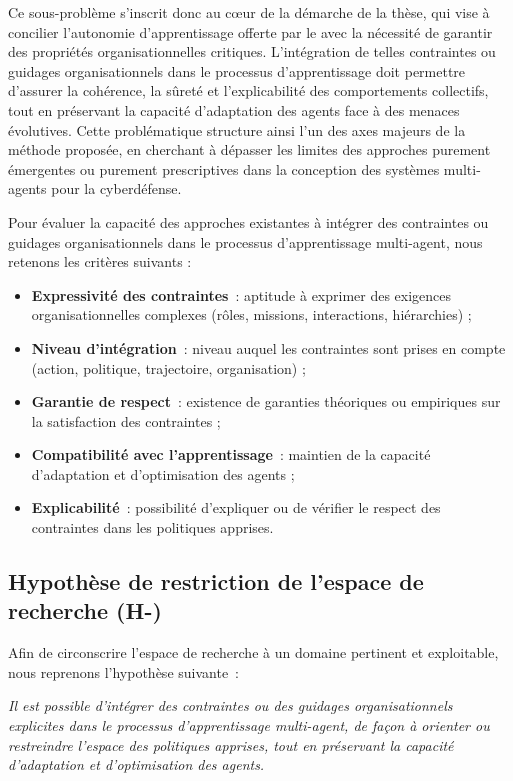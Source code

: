 Ce sous-problème s'inscrit donc au cœur de la démarche de la thèse, qui vise à concilier l'autonomie d'apprentissage offerte par le  avec la nécessité de garantir des propriétés organisationnelles critiques. L'intégration de telles contraintes ou guidages organisationnels dans le processus d'apprentissage doit permettre d'assurer la cohérence, la sûreté et l'explicabilité des comportements collectifs, tout en préservant la capacité d'adaptation des agents face à des menaces évolutives. Cette problématique structure ainsi l'un des axes majeurs de la méthode proposée, en cherchant à dépasser les limites des approches purement émergentes ou purement prescriptives dans la conception des systèmes multi-agents pour la cyberdéfense.

Pour évaluer la capacité des approches existantes à intégrer des contraintes ou guidages organisationnels dans le processus d'apprentissage multi-agent, nous retenons les critères suivants :
\begin{itemize}
  \item \textbf{Expressivité des contraintes}~: aptitude à exprimer des exigences organisationnelles complexes (rôles, missions, interactions, hiérarchies) ;
  \item \textbf{Niveau d’intégration}~: niveau auquel les contraintes sont prises en compte (action, politique, trajectoire, organisation) ;
  \item \textbf{Garantie de respect}~: existence de garanties théoriques ou empiriques sur la satisfaction des contraintes ;
  \item \textbf{Compatibilité avec l’apprentissage}~: maintien de la capacité d’adaptation et d’optimisation des agents ;
  \item \textbf{Explicabilité}~: possibilité d’expliquer ou de vérifier le respect des contraintes dans les politiques apprises.
\end{itemize}

\subsection*{Hypothèse de restriction de l’espace de recherche (H-)}

Afin de circonscrire l’espace de recherche à un domaine pertinent et exploitable, nous reprenons l’hypothèse suivante~:

\textit{Il est possible d’intégrer des contraintes ou des guidages organisationnels explicites dans le processus d’apprentissage multi-agent, de façon à orienter ou restreindre l’espace des politiques apprises, tout en préservant la capacité d’adaptation et d’optimisation des agents.}

